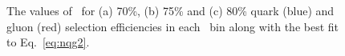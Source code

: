 \begin{figure}[p]
 \centering

\caption{ The values of \ntrk\ for (a) 70\%,  (b) 75\%  and (c) 80\% quark (blue) and gluon (red) 
selection efficiencies in each \pT\ bin along with the best fit to Eq.~\ref{eq:nqg2}.
 \label{fig:qg_selection_curves2}}
\end{figure}

